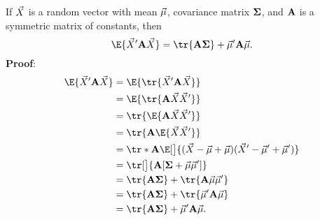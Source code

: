 \begin{Theorem}{}{}
    If $ \vec{X} $ is a random vector with mean $ \vec{\mu} $, covariance matrix $ \mathbf{\Sigma} $,
    and $ \mathbf{A} $ is a symmetric matrix of constants, then
    \[ \E{\Vector{X}'\Matrix{A}\Vector{X}}=\tr{\Matrix{A\Sigma}}+\Vector{\mu}'\Matrix{A}\Vector{\mu}. \]
    \tcblower{}
    \textbf{Proof}:
    \begin{align*}
        \E{\Vector{X}'\Matrix{A}\Vector{X}}
         & =\E{\tr{\Vector{X}'\Matrix{A}\Vector{X}}}                                                                  \\
         & =\E{\tr{\Matrix{A}\Vector{X}\Vector{X}'}}                                                                  \\
         & =\tr{\E{\Matrix{A}\Vector{X}\Vector{X}'}}                                                                  \\
         & =\tr{\Matrix{A}\E{\Vector{X}\Vector{X}'}}                                                                  \\
         & =\tr*{\Matrix{A}\E[\big]{(\Vector{X}-\Vector{\mu}+\Vector{\mu})(\Vector{X}'-\Vector{\mu}'+\Vector{\mu}')}} \\
         & =\tr[\big]{\Matrix{A}[\Matrix{\Sigma}+\Vector{\mu}\Vector{\mu}']}                                          \\
         & =\tr{\Matrix{A\Sigma}}+\tr{\Matrix{A}\Vector{\mu}\Vector{\mu}'}                                            \\
         & =\tr{\Matrix{A\Sigma}}+\tr{\Vector{\mu}'\Matrix{A}\Vector{\mu}}                                            \\
         & =\tr{\Matrix{A\Sigma}}+\Vector{\mu}'\Matrix{A}\Vector{\mu}.
    \end{align*}
\end{Theorem}
